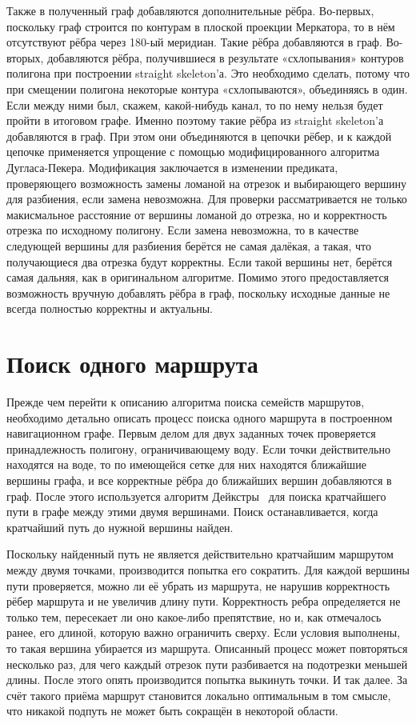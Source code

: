 Также в полученный граф добавляются дополнительные рёбра. Во-первых,
поскольку граф строится по контурам в плоской проекции Меркатора, то в
нём отсутствуют рёбра через 180-ый меридиан. Такие рёбра добавляются в
граф. Во-вторых, добавляются рёбра, получившиеся в результате
«схлопывания» контуров полигона при построении straight skeleton'а.
Это необходимо сделать, потому что при смещении полигона некоторые
контура «схлопываются», объединяясь в один. Если между ними был,
скажем, какой-нибудь канал, то по нему нельзя будет пройти в итоговом
графе. Именно поэтому такие рёбра из straight skeleton'а добавляются в
граф. При этом они объединяются в цепочки рёбер, и к каждой цепочке
применяется упрощение с помощью модифицированного алгоритма
Дугласа-Пекера. Модификация заключается в изменении предиката,
проверяющего возможность замены ломаной на отрезок и выбирающего
вершину для разбиения, если замена невозможна. Для проверки
рассматривается не только макисмальное расстояние от вершины ломаной
до отрезка, но и корректность отрезка по исходному полигону. Если
замена невозможна, то в качестве следующей вершины для разбиения
берётся не самая далёкая, а такая, что получающиеся два отрезка будут
корректны. Если такой вершины нет, берётся самая дальняя, как в
оригинальном алгоритме. Помимо этого предоставляется возможность
вручную добавлять рёбра в граф, поскольку исходные данные не всегда
полностью корректны и актуальны.

\FloatBarrier

\section{Поиск одного маршрута}

\label{sec:single-search}

Прежде чем перейти к описанию алгоритма поиска семейств маршрутов,
необходимо детально описать процесс поиска одного маршрута в
построенном навигационном графе. Первым делом для двух заданных точек
проверяется принадлежность полигону, ограничивающему воду. Если точки
действительно находятся на воде, то по имеющейся сетке для них
находятся ближайшие вершины графа, и все корректные рёбра до ближайших
вершин добавляются в граф. После этого используется алгоритм
Дейкстры~\cite{dijkstra1959note} для поиска кратчайшего пути в графе
между этими двумя вершинами. Поиск останавливается, когда кратчайший
путь до нужной вершины найден.

Поскольку найденный путь не является действительно кратчайшим
маршрутом между двумя точками, производится попытка его сократить. Для
каждой вершины пути проверяется, можно ли её убрать из маршрута, не
нарушив корректность рёбер маршрута и не увеличив длину пути.
Корректность ребра определяется не только тем, пересекает ли оно
какое-либо препятствие, но и, как отмечалось ранее, его длиной,
которую важно ограничить сверху. Если условия выполнены, то такая
вершина убирается из маршрута. Описанный процесс может повторяться
несколько раз, для чего каждый отрезок пути разбивается на подотрезки
меньшей длины. После этого опять производится попытка выкинуть точки.
И так далее. За счёт такого приёма маршрут становится локально
оптимальным в том смысле, что никакой подпуть не может быть сокращён в
некоторой области.


